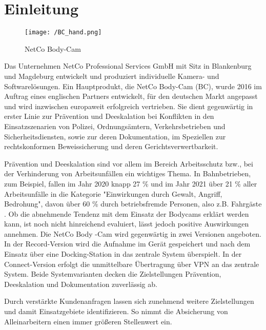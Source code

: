 \documentclass[thesis.tex]{subfiles}
\begin{document}
\chapter{Einleitung}
\label{chap:Einleitung}

\begin{figure}[h]
    \centering
    \texttt{[image: /BC\_hand.png]}
    \caption{NetCo Body-Cam}
    \label{fig:BC}
\end{figure}

Das Unternehmen NetCo Professional Services GmbH mit Sitz in Blankenburg und Magdeburg entwickelt und produziert individuelle Kamera- und Softwarelösungen.
Ein Hauptprodukt, die NetCo Body-Cam (BC), wurde 2016 im Auftrag eines englischen Partners entwickelt, für den deutschen Markt angepasst und wird inzwischen europaweit erfolgreich vertrieben.
Sie dient gegenwärtig in erster Linie zur Prävention und Deeskalation bei Konflikten in den Einsatzszenarien von Polizei, Ordnungsämtern, Verkehrsbetrieben und Sicherheitsdiensten, sowie zur deren Dokumentation, im Speziellen zur rechtskonformen Beweissicherung und deren Gerichtsverwertbarkeit.

Prävention und Deeskalation sind vor allem im Bereich Arbeitsschutz bzw., bei der Verhinderung von Arbeitsunfällen ein wichtiges Thema.
In Bahnbetrieben, zum Beispiel, fallen im Jahr 2020 knapp 27 \% und im Jahr 2021 über 21 \% aller Arbeitsunfälle in die Kategorie "Einwirkungen durch Gewalt, Angriff, Bedrohung", davon über 60 \% durch betriebsfremde Personen, also z.B. Fahrgäste \cite[jeweils S.87 ff.]{Unfallgeschehen2020,Unfallgeschehen2021}.
Ob die abnehmende Tendenz mit dem Einsatz der Bodycams erklärt werden kann, ist noch nicht hinreichend evaluiert, lässt jedoch positive Auswirkungen annehmen.
Die NetCo Body -Cam wird gegenwärtig in zwei Versionen angeboten.
In der Record-Version wird die Aufnahme im Gerät gespeichert und nach dem Einsatz über eine Docking-Station in das zentrale System überspielt.
In der Connect-Version erfolgt die unmittelbare Übertragung über VPN an das zentrale System.
Beide Systemvarianten decken die Zielstellungen Prävention, Deeskalation und Dokumentation zuverlässig ab.

Durch verstärkte Kundenanfragen lassen sich zunehmend weitere Zielstellungen und damit Einsatzgebiete identifizieren.
So nimmt die Absicherung von Alleinarbeitern einen immer größeren Stellenwert ein.
\end{document}
